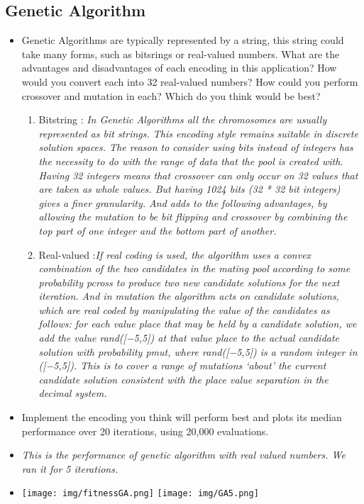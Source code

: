 \documentclass{article}
\begin{document}
\subsection{Genetic Algorithm}
\begin{itemize}
	\item Genetic Algorithms are typically represented by a string, this string could take many forms, such as bitsrings or real-valued numbers. What are the advantages and disadvantages of each encoding in this application? How would you convert each into 32 real-valued numbers? How could you perform crossover and mutation in each? Which do you think would be best?
	\begin{enumerate}
		\item Bitstring :
		\color{blue}\textit{In Genetic Algorithms all the chromosomes are usually represented as bit strings. This encoding style remains suitable in discrete solution spaces. The reason to consider using bits instead of integers has the necessity to do with the range of data that the pool is created with. Having 32 integers means that crossover can only occur on 32 values that are taken as whole values. But having 1024 bits (32 * 32 bit integers) gives a finer granularity. And adds to the following advantages, by allowing the mutation to be bit flipping and crossover by combining the top part of one integer and the bottom part of another.}
		\item \color{black}Real-valued :\color{blue}\textit{If real coding is used, the algorithm uses a convex combination of the two candidates in the mating pool according to some probability pcross to produce two new candidate solutions for the next iteration. And in mutation the algorithm acts on candidate solutions, which are real coded by manipulating the value of the candidates as follows: for each
			value place that may be held by a candidate solution, we add the value rand([−5,5]) at  that  value  place  to  the  actual  candidate  solution  with probability pmut, where rand([−5,5]) is a random integer in ([−5,5]). This is to cover a range of mutations ‘about’ the  current candidate  solution  consistent  with  the  place value separation in the decimal system.}
	\end{enumerate}
	\item Implement the encoding you think will perform best and plots its median performance over 20 iterations, using 20,000 evaluations.
\item \color{blue}\textit{This is the performance of genetic algorithm with real valued numbers. We ran it for 5 iterations.}
\item
	\texttt{[image: img/fitnessGA.png]}
	\texttt{[image: img/GA5.png]}

\end{itemize}
\end{document}
